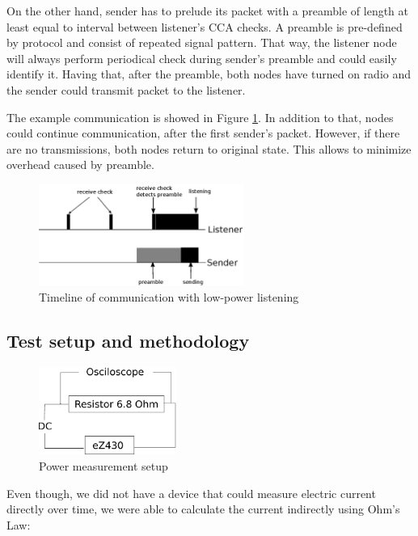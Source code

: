 On the other hand, sender has to prelude its packet with a preamble of length at least equal to interval between listener's CCA checks.
A preamble is pre-defined by protocol and consist of repeated signal pattern.
That way, the listener node will always perform periodical check during sender's preamble and could easily identify it.
Having that, after the preamble, both nodes have turned on radio and the sender could transmit packet to the listener.

The example communication is showed in Figure \ref{fig:low_power_listening}.
In addition to that, nodes could continue communication, after the first sender's packet.
However, if there are no transmissions, both nodes return to original state.
This allows to minimize overhead caused by preamble.

\begin{figure}[h]
  \centering
  \includegraphics[width=0.6\textwidth]{diagrams/low_power_listening.eps}
  \caption{Timeline of communication with low-power listening}
  \label{fig:low_power_listening}
\end{figure}

\subsection{Test setup and methodology}

\begin{figure}[h]
  \centering
  \includegraphics[width=0.4\textwidth]{diagrams/power.eps}
  \caption{Power measurement setup}
  \label{fig:power}
\end{figure}

Even though, we did not have a device that could measure electric current directly over time, we were able to calculate the current indirectly using Ohm's Law: 

